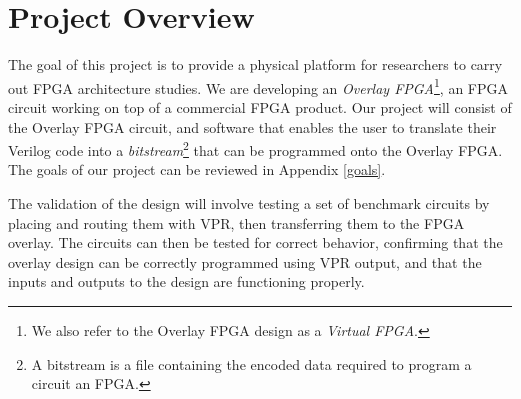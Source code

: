 \section{Project Overview}


The goal of this project is to provide a physical platform for researchers to carry out FPGA architecture studies.
We are developing an \emph{Overlay FPGA}\footnote{We also refer to the Overlay FPGA design as a \emph{Virtual FPGA}.}, an FPGA circuit working on top of a commercial FPGA product.
Our project will consist of the Overlay FPGA circuit, and software that enables the user to translate their Verilog code into a \emph{bitstream}\footnote{A bitstream is a file containing the encoded data required to program a circuit an FPGA.} that can be programmed onto the Overlay FPGA.
The goals of our project can be reviewed in Appendix \ref{goals}.



The validation of the design will involve testing a set of benchmark circuits by placing and
routing them with VPR, then transferring them to the FPGA overlay. The circuits can
then be tested for correct behavior, confirming that the overlay design can be correctly programmed using VPR output, and that the inputs and outputs to the design are functioning
properly.


